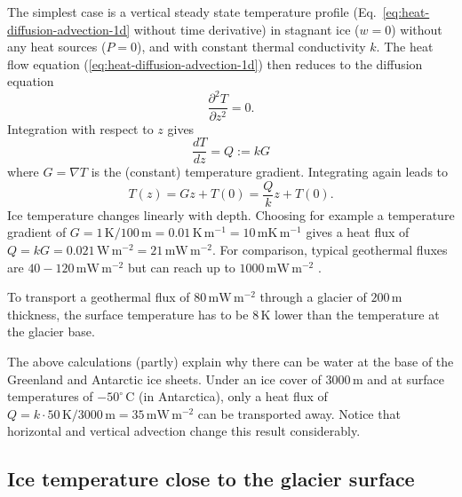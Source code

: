 \documentclass[parskip=half]{scrartcl}
\newcommand{\unit}[1]{\ensuremath{\,\mathrm{#1}}}
\newcommand{\cels}[1]{\ensuremath{#1^{\circ}\,\mathrm{C}}}
\begin{document}
The simplest case is a vertical steady state temperature profile
(Eq.~\ref{eq:heat-diffusion-advection-1d} without time derivative) in
stagnant ice ($w=0$) without any heat sources ($P=0$), and with
constant thermal conductivity $k$.  The heat flow equation
(\ref{eq:heat-diffusion-advection-1d}) then reduces to the diffusion
equation
%
\begin{equation}
 \label{eq:diffusion-1d} \frac{\partial^2T}{\partial z^2} = 0.
\end{equation}
%
Integration with respect to $z$ gives
%
\begin{equation}
 \label{eq:diffusion-1d-1int} \frac{dT}{d z} = Q := k G
\end{equation}
%
where $G = \nabla T$ is the (constant) temperature
gradient. Integrating again leads to
%
\begin{equation}
 \label{eq:diffusion-1d-2int} T(z) = G z + T(0) = \frac{Q}{k} z +
T(0).
\end{equation}
%
Ice temperature changes linearly with depth.  Choosing for example a
temperature gradient of $G=1\unit{K}/ 100\unit{m} =
0.01\unit{K}\unit{m}^{-1} = 10 \unit{mK}\unit{m}^{-1}$ gives a heat
flux of $Q = kG = 0.021\unit{W} \unit{m}^{-2} = 21\unit{mW}
\unit{m}^{-2}$.  For comparison, typical geothermal fluxes are $40-
120 \unit{mW} \unit{m}^{-2}$ but can reach up to $1000 \unit{mW} \unit{m}^{-2}$ \citep{Fahnestock2001a}. 

To transport a geothermal flux of $80 \unit{mW} \unit{m}^{-2}$ through
a glacier of $200\unit{m}$ thickness, the surface temperature has to
be $8\unit{K}$ lower than the temperature at the glacier base.

The above calculations (partly) explain why there can be water at the
base of the Greenland and Antarctic ice sheets.  Under an ice cover of
$3000\unit{m}$ and at surface temperatures of \cels{-50} (in
Antarctica), only a heat flux of $Q=k \cdot 50\unit{K}/3000\unit{m}=
35\unit{mW}\unit{m}^{-2}$ can be transported away.  Notice that
horizontal and vertical advection change this result considerably.


\subsection{Ice temperature close to the glacier surface}
\label{sec:ice-temp-surface}
\end{document}
